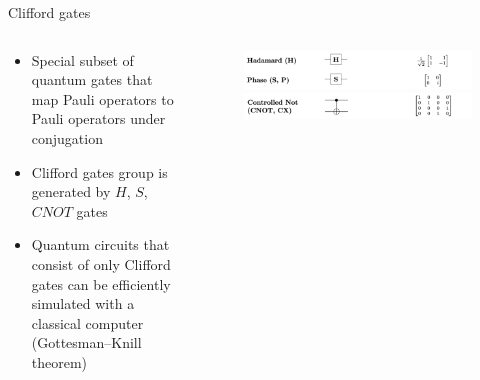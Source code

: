\documentclass[aspectratio=169,10pt]{beamer}
\begin{document}
\begin{frame}{Clifford gates}
  \begin{columns}
    \begin{column}{0.4\textwidth}
      \begin{itemize}[label=\textbullet]
        \item Special subset of quantum gates that map Pauli operators to Pauli operators under conjugation
        \hspace{10mm}
        \item Clifford gates group is generated by $H$, $S$, $CNOT$ gates
        \hspace{10mm}
        \item Quantum circuits that consist of only Clifford gates can be efficiently simulated with a classical computer (Gottesman–Knill theorem)
      \end{itemize}
    \end{column}
    \begin{column}{0.6\textwidth}
      \begin{figure}
        \centering
        \includegraphics[width=\textwidth]{figures/HS.png}
        \includegraphics[width=\textwidth]{figures/CNOT.png}
        \vfill
      \end{figure}
    \end{column}
  \end{columns}
\end{frame}
\end{document}
